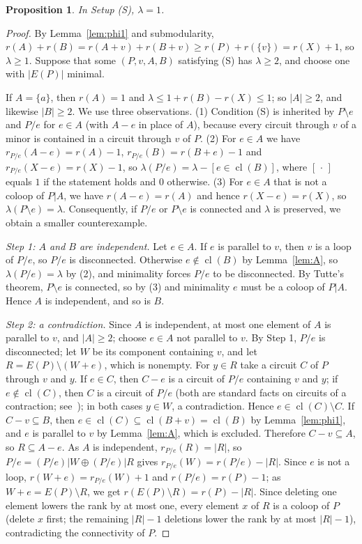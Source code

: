 \documentclass[11pt,a4paper]{article}
\theoremstyle{plain}
\newtheorem{proposition}[theorem]{Proposition}
\theoremstyle{definition}
\newcommand{\cl}{\operatorname{cl}}
\begin{document}
\begin{proposition}\label{prop:Q}
In Setup (S), $\lambda=1$.
\end{proposition}
\begin{proof}
By Lemma~\ref{lem:phi1} and submodularity, $r(A)+r(B)=r(A+v)+r(B+v)\ge r(P)+r(\{v\})=r(X)+1$, so $\lambda\ge1$. Suppose that some $(P,v,A,B)$ satisfying (S) has $\lambda\ge2$, and choose one with $|E(P)|$ minimal.

If $A=\{a\}$, then $r(A)=1$ and $\lambda\le1+r(B)-r(X)\le1$; so $|A|\ge2$, and likewise $|B|\ge2$. We use three observations. (1) Condition (S) is inherited by $P\setminus e$ and $P/e$ for $e\in A$ (with $A-e$ in place of $A$), because every circuit through $v$ of a minor is contained in a circuit through $v$ of $P$. (2) For $e\in A$ we have $r_{P/e}(A-e)=r(A)-1$, $r_{P/e}(B)=r(B+e)-1$ and $r_{P/e}(X-e)=r(X)-1$, so $\lambda(P/e)=\lambda-[e\in\cl(B)]$, where $[\,\cdot\,]$ equals $1$ if the statement holds and $0$ otherwise. (3) For $e\in A$ that is not a coloop of $P|A$, we have $r(A-e)=r(A)$ and hence $r(X-e)=r(X)$, so $\lambda(P\setminus e)=\lambda$. Consequently, if $P/e$ or $P\setminus e$ is connected and $\lambda$ is preserved, we obtain a smaller counterexample.

\emph{Step 1: $A$ and $B$ are independent.} Let $e\in A$. If $e$ is parallel to $v$, then $v$ is a loop of $P/e$, so $P/e$ is disconnected. Otherwise $e\notin\cl(B)$ by Lemma~\ref{lem:A}, so $\lambda(P/e)=\lambda$ by (2), and minimality forces $P/e$ to be disconnected. By Tutte's theorem, $P\setminus e$ is connected, so by (3) and minimality $e$ must be a coloop of $P|A$. Hence $A$ is independent, and so is $B$.

\emph{Step 2: a contradiction.} Since $A$ is independent, at most one element of $A$ is parallel to $v$, and $|A|\ge2$; choose $e\in A$ not parallel to $v$. By Step 1, $P/e$ is disconnected; let $W$ be its component containing $v$, and let $R=E(P)\setminus(W+e)$, which is nonempty. For $y\in R$ take a circuit $C$ of $P$ through $v$ and $y$. If $e\in C$, then $C-e$ is a circuit of $P/e$ containing $v$ and $y$; if $e\notin\cl(C)$, then $C$ is a circuit of $P/e$ (both are standard facts on circuits of a contraction; see~\cite[Chapter~3]{Ox11}); in both cases $y\in W$, a contradiction. Hence $e\in\cl(C)\setminus C$. If $C-v\subseteq B$, then $e\in\cl(C)\subseteq\cl(B+v)=\cl(B)$ by Lemma~\ref{lem:phi1}, and $e$ is parallel to $v$ by Lemma~\ref{lem:A}, which is excluded. Therefore $C-v\subseteq A$, so $R\subseteq A-e$. As $A$ is independent, $r_{P/e}(R)=|R|$, so $P/e=(P/e)|W\oplus(P/e)|R$ gives $r_{P/e}(W)=r(P/e)-|R|$. Since $e$ is not a loop, $r(W+e)=r_{P/e}(W)+1$ and $r(P/e)=r(P)-1$; as $W+e=E(P)\setminus R$, we get $r(E(P)\setminus R)=r(P)-|R|$. Since deleting one element lowers the rank by at most one, every element $x$ of $R$ is a coloop of $P$ (delete $x$ first; the remaining $|R|-1$ deletions lower the rank by at most $|R|-1$), contradicting the connectivity of $P$.
\end{proof}
\end{document}
